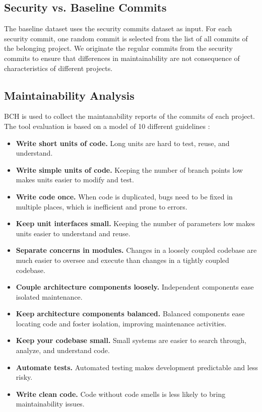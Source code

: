 \documentclass[10pt,conference]{IEEEtran}
\begin{document}
\subsection{Security vs. Baseline Commits}

The baseline dataset uses the security commits dataset as input. For each security commit, one random commit is selected from the list of all commits of the belonging project. We originate the regular commits from the security commits to ensure that differences in maintainability are not consequence of characteristics
of different projects.


\subsection{Maintainability Analysis}

BCH is used to collect the maintanability reports of the commits of each project. The tool
evaluation is based on a model of 10 different guidelines \cite{Visser:2016:OREILLY}:

\begin{itemize}
	\item \textbf{Write short units of code.} Long units are hard to test, reuse, and understand.
	\item \textbf{Write simple units of code.} Keeping the number of branch points low makes units easier to modify and test.
	\item \textbf{Write code once.} When code is duplicated, bugs need to be fixed in multiple places, which is inefficient and
prone to errors.
	\item \textbf{Keep unit interfaces small.} Keeping the number of parameters low makes units easier to understand and reuse.
	\item \textbf{Separate concerns in modules.} Changes in a loosely
coupled codebase are much easier to oversee and execute
than changes in a tightly coupled codebase.
	\item \textbf{Couple architecture components loosely.} Independent
components ease isolated maintenance.
	\item \textbf{Keep architecture components balanced.} Balanced
components ease locating code and foster isolation,
improving maintenance activities.
	\item \textbf{Keep your codebase small.} Small systems are easier to
search through, analyze, and understand code.
	\item \textbf{Automate tests.} Automated testing makes development
predictable and less risky.
	\item \textbf{Write clean code.} Code without code smells is less likely to bring maintainability issues.
\end{itemize}
\end{document}

